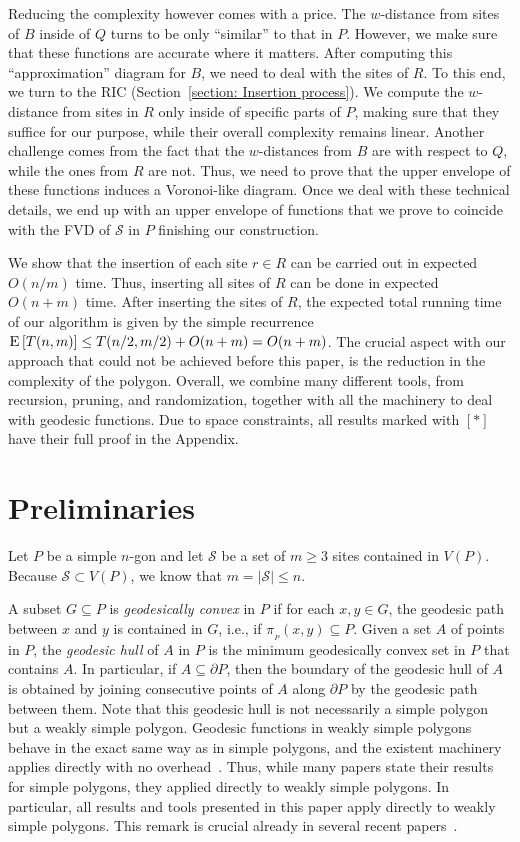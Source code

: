 \documentclass[a4paper,UKenglish]{socg-lipics-v2018}
\newcommand{\s}{\mathcal S}
\newcommand{\p}[3][P]{\ensuremath{\pi_{_{#1}}(#2, #3)}}
\newcommand{\ex}[1]{\textsc{E}\left[#1\right]}
\begin{document}
Reducing the complexity however comes with a price. The $w$-distance from sites  of $B$ inside of $Q$ turns to be only ``similar'' to that in $P$.
However, we make sure that these functions are accurate where it matters. 
After computing this ``approximation'' diagram for $B$, we need to deal with the sites of $R$. 
To this end, we turn to the RIC (Section~\ref{section: Insertion process}).
We compute the $w$-distance from sites in $R$ only inside of specific parts of $P$, making sure that they suffice for our purpose, while their overall complexity remains linear.
Another challenge comes from the fact that the $w$-distances from $B$ are with respect to $Q$, while the ones from $R$ are not.
Thus, we need to prove that the upper envelope of these functions induces a Voronoi-like diagram.
Once we deal with these technical details, we end up with an upper envelope of functions that we prove to coincide with the FVD of $\s$ in $P$ finishing our construction. 

We show that the insertion of each site $r\in R$ can be carried out in expected $O(n/m)$ time.  
Thus, inserting all sites of $R$ can be done in expected $O(n+ m)$ time.
After inserting the sites of $R$, the expected total running time of our algorithm is given by the simple recurrence $\ex{T(n, m)} \leq T(n/2, m/2) + O(n+m) = O(n+ m)$.
The crucial aspect with our approach that could not be achieved before this paper, is the reduction in the complexity of the polygon. 
Overall, we combine many different tools, from recursion, pruning, and randomization, together with all the machinery to deal with geodesic functions. 
Due to space constraints, all results marked with $[*]$ have their full proof in the Appendix. 

\section{Preliminaries}

Let $P$ be a simple $n$-gon and  let $\s$ be a set of $m\geq 3$ sites contained in $V(P)$. 
Because $\s\subset V(P)$, we know that $m = |\s|\leq  n$.

A subset $G\subseteq P$ is \emph{geodesically convex} in $P$ if for each $x,y\in G$, the geodesic path between $x$ and $y$ is contained in $G$, i.e., if $\p{x}{y}\subseteq P$.
Given a set $A$ of points in $P$, the \emph{geodesic hull} of $A$ in $P$ is the minimum geodesically convex set in $P$ that contains $A$. 
In particular, if $A\subseteq \partial P$, then the boundary of the geodesic hull of $A$ is obtained by joining consecutive points of $A$ along $\partial P$ by the geodesic path between them. Note that this geodesic hull is not necessarily a simple polygon but a weakly simple polygon. 
Geodesic functions in weakly simple polygons behave in the exact same way as in simple polygons, and the existent machinery applies directly with no overhead~\cite{chang2014detecting}. 
Thus, while many papers state their results for simple polygons, they applied directly to weakly simple polygons. 
In particular, all results and tools presented in this paper apply directly to weakly simple polygons.
This remark is crucial already in several recent papers~\cite{oh2016computing,oh2016farthest}.
\end{document}
